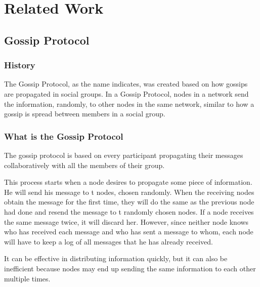 
%

\chapter{Related Work}
\label{cha:related_work}

\section{Gossip Protocol}
\label{sec:gossip_protocol}

\subsection{History}
\quad The Gossip Protocol, as the name indicates, was created based on how gossips are
propagated in social groups. In a Gossip Protocol, nodes in a network send the information,
randomly, to other nodes in the same network, similar to how a gossip is spread between
members in a social group.\cite{Leitao07}


\subsection{What is the Gossip Protocol}
\quad The gossip protocol is based on every participant propagating their messages collaboratively
with all the members of their group.

This process starts when a node desires to propagate some piece of information. He will send
his message to t nodes, chosen randomly. When the receiving nodes obtain the message for the
first time, they will do the same as the previous node had done and resend the message to t
randomly chosen nodes. If a node receives the same message twice, it will discard her. However,
since neither node knows who has received each message and who has sent a message to whom, each
node will have to keep a log of all messages that he has already received.


It can be effective in distributing information quickly, but it can also be inefficient because
nodes may end up sending the same information to each other multiple times.

